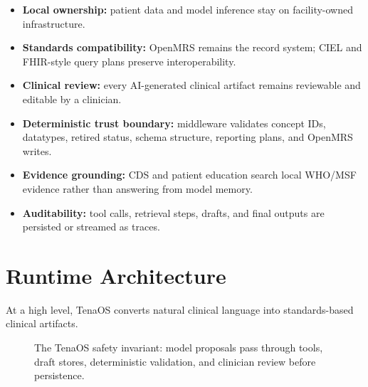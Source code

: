 \documentclass[11pt]{article}
\newcommand{\Product}{TenaOS}
\newcommand{\Gemma}{Gemma 4 E4B}
\newcommand{\OpenMRS}{OpenMRS}
\newcommand{\CIEL}{CIEL}
\newcommand{\WHO}{WHO/MSF}
\begin{document}
\begin{itemize}
  \item \textbf{Local ownership:} patient data and model inference stay on facility-owned infrastructure.
  \item \textbf{Standards compatibility:} \OpenMRS{} remains the record system; \CIEL{} and FHIR-style query plans preserve interoperability.
  \item \textbf{Clinical review:} every AI-generated clinical artifact remains reviewable and editable by a clinician.
  \item \textbf{Deterministic trust boundary:} middleware validates concept IDs, datatypes, retired status, schema structure, reporting plans, and \OpenMRS{} writes.
  \item \textbf{Evidence grounding:} CDS and patient education search local \WHO{} evidence rather than answering from model memory.
  \item \textbf{Auditability:} tool calls, retrieval steps, drafts, and final outputs are persisted or streamed as traces.
\end{itemize}

\section{Runtime Architecture}

At a high level, \Product{} converts natural clinical language into standards-based clinical artifacts.

\begin{figure}[h]
\centering
{}
\caption{The TenaOS safety invariant: model proposals pass through tools, draft stores, deterministic validation, and clinician review before persistence.}
\end{figure}
\end{document}
